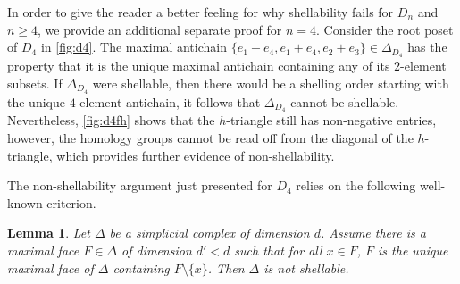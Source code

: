 \documentclass[11pt]{amsart}
\theoremstyle{plain}
\newtheorem{lemma}{Lemma}
\numberwithin{lemma}{\DefaultNumberTheoremWithin}
\numberwithin{theorem}{\DefaultNumberTheoremWithin}
\numberwithin{corollary}{\DefaultNumberTheoremWithin}
\numberwithin{proposition}{\DefaultNumberTheoremWithin}
\numberwithin{conjecture}{\DefaultNumberTheoremWithin}
\theoremstyle{definition}
\numberwithin{definition}{\DefaultNumberTheoremWithin}
\numberwithin{question}{\DefaultNumberTheoremWithin}
\numberwithin{problem}{\DefaultNumberTheoremWithin}
\theoremstyle{remark}
\numberwithin{remark}{\DefaultNumberTheoremWithin}
\numberwithin{example}{\DefaultNumberTheoremWithin}
\numberwithin{claim}{\DefaultNumberTheoremWithin}
\begin{document}
In order to give the reader a better feeling for why shellability fails for $D_n$ and $n \geq 4$, we provide an additional
separate proof for $n=4$.
Consider the root poset of $D_4$ in \ref{fig:d4}. The maximal antichain
$\{e_1-e_4,e_1+e_4,e_2+e_3\} \in \Delta_{D_4}$ has the property that it is the
unique maximal antichain containing any of 
its $2$-element subsets. 
If $\Delta_{D_4}$ were shellable, then there would be a shelling order starting with the unique $4$-element antichain,
it follows that $\Delta_{D_4}$ cannot be shellable. Nevertheless, \ref{fig:d4fh}
shows that the $h$-triangle still has non-negative entries, however, the homology groups cannot be read off from the diagonal of the $h$-triangle, which provides further evidence of non-shellability.

The non-shellability argument just presented for $D_4$ relies on the following well-known criterion.

\begin{lemma}\label{lem:nonshel} Let $\Delta$ be a simplicial complex of dimension $d$. 
Assume there
is a maximal face $F \in \Delta$ of dimension $d' < d$ such that for all 
$x \in F$,
 $F$ is the unique maximal face of $\Delta$ containing $F
\setminus \{x\}$. 
Then $\Delta$ is not shellable.
\end{lemma}
\end{document}
